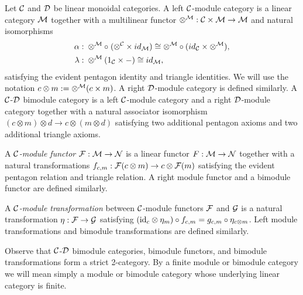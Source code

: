 \documentclass{amsart}
\begin{document}
\begin{definition}
Let $\mathcal C$ and $\mathcal D$ be linear monoidal categories.
A left $\mathcal C$-module category is a linear category $\mathcal M$ together with a multilinear functor $\otimes^{\mathcal M}: \mathcal C \times \mathcal M \to \mathcal M$ and natural isomorphisms
	\begin{align*}
		\alpha: & \;    \otimes^{\mathcal M} \circ \; (\otimes^{\mathcal C} \times id_{\mathcal M}) \cong  \otimes^{\mathcal M} \circ (id_{\mathcal C} \times \otimes^{\mathcal M}), \\
		\lambda: & \; \otimes^{\mathcal M} (1_{\mathcal C} \times -) \cong id_{\mathcal M},
	\end{align*}
	satisfying the evident pentagon identity and triangle identities.  We will use the notation $c \otimes m := \otimes^\mathcal M(c \times m)$.  A right $\mathcal D$-module category is defined similarly.
	A $\mathcal C$-$\mathcal D$ bimodule category is a left $\mathcal C$-module category and a right $\mathcal D$-module category together with a natural associator isomorphism $(c \otimes m) \otimes d \rightarrow c \otimes (m \otimes d)$ satisfying two additional pentagon axioms and two additional triangle axioms.
\end{definition}

\begin{definition}		
A {\em $\mathcal C$-module functor} $\mathcal F:\mathcal M \to \mathcal N$ is a linear functor $F:\mathcal M \to \mathcal N$ together with a natural transformations $f_{c,m}:\mathcal F(c \otimes m) \rightarrow c \otimes \mathcal F(m)$ satisfying the evident pentagon relation and triangle relation.  A right module functor and a bimodule functor are defined similarly.
\end{definition}
\begin{definition}
	A {\em $\mathcal C$-module transformation} between $\mathcal C$-module functors $\mathcal F$ and $\mathcal G$ is a natural transformation $\eta: \mathcal F \rightarrow \mathcal G$ satisfying $(\mathrm{id}_c \otimes \eta_m) \circ f_{c,m} = g_{c,m} \circ \eta_{c \otimes m}$.  Left module transformations and bimodule transformations are defined similarly.
\end{definition} %
	
%
\nid Observe that $\mathcal C$-$\mathcal D$ bimodule categories, bimodule functors, and bimodule transformations form a strict 2-category.  By a finite module or bimodule category we will mean simply a module or bimodule category whose underlying linear category is finite.
\end{document}
